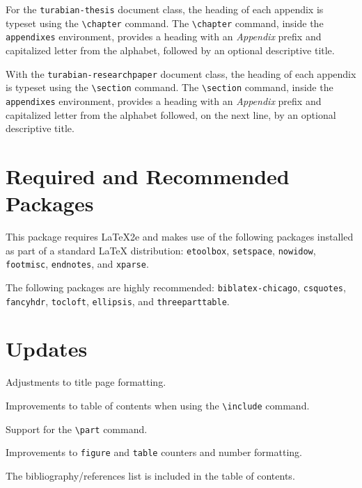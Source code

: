 \documentclass{article}
\newcommand{\textcmd}[1]{\texttt{\textbackslash #1}}
\begin{document}
For the \texttt{turabian-thesis} document class, the heading of each appendix is typeset using the \textcmd{chapter} command. The \textcmd{chapter} command, inside the \texttt{appendixes} environment, provides a heading with an \emph{Appendix} prefix and capitalized letter from the alphabet, followed by an optional descriptive title.

With the \texttt{turabian-researchpaper} document class, the heading of each appendix is typeset using the \textcmd{section} command. The \textcmd{section} command, inside the \texttt{appendixes} environment, provides a heading with an \emph{Appendix} prefix and capitalized letter from the alphabet followed, on the next line, by an optional descriptive title.


\clearpage
\section{Required and Recommended Packages}
\label{sec:required_packages}


This package requires \LaTeX{}2e and makes use of the following packages installed as part of a standard \LaTeX{} distribution: \texttt{etoolbox}, \texttt{setspace}, \texttt{nowidow}, \texttt{footmisc}, \texttt{endnotes}, and \texttt{xparse}.

The following packages are highly recommended: \texttt{biblatex-chicago}, \texttt{csquotes}, \texttt{fancyhdr}, \texttt{tocloft}, \texttt{ellipsis}, and \texttt{threeparttable}.


\clearpage
\section{Updates}
\label{sec:updates}


%

Adjustments to title page formatting.

%

Improvements to table of contents when using the \textcmd{include} command.

%

Support for the \textcmd{part} command.

Improvements to \texttt{figure} and \texttt{table} counters and number formatting.

The bibliography/references list is included in the table of contents.

%
\end{document}
